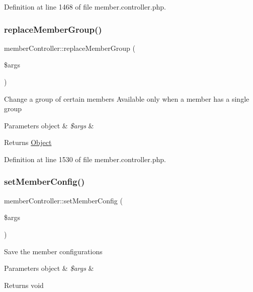 Definition at line 1468 of file member.\+controller.\+php.

\hypertarget{classmemberController_acc92443cdd02e55cec12099722482737}{}\label{classmemberController_acc92443cdd02e55cec12099722482737} 
\subsubsection{\texorpdfstring{replace\+Member\+Group()}{replaceMemberGroup()}}
{\footnotesize\ttfamily member\+Controller\+::replace\+Member\+Group (\begin{DoxyParamCaption}\item[{}]{\$args }\end{DoxyParamCaption})}

Change a group of certain members Available only when a member has a single group


\begin{DoxyParams}[1]{Parameters}
object & {\em \$args} & \\
\hline
\end{DoxyParams}
\begin{DoxyReturn}{Returns}
\hyperlink{classObject}{Object} 
\end{DoxyReturn}


Definition at line 1530 of file member.\+controller.\+php.

\hypertarget{classmemberController_a842fafd2abf22d779591486124003d92}{}\label{classmemberController_a842fafd2abf22d779591486124003d92} 
\subsubsection{\texorpdfstring{set\+Member\+Config()}{setMemberConfig()}}
{\footnotesize\ttfamily member\+Controller\+::set\+Member\+Config (\begin{DoxyParamCaption}\item[{}]{\$args }\end{DoxyParamCaption})}

Save the member configurations


\begin{DoxyParams}[1]{Parameters}
object & {\em \$args} & \\
\hline
\end{DoxyParams}
\begin{DoxyReturn}{Returns}
void 
\end{DoxyReturn}


